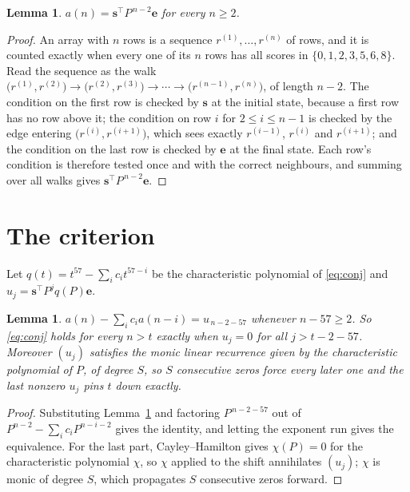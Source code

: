 \documentclass[11pt,a4paper]{article}
\theoremstyle{plain}
\newtheorem{lemma}[theorem]{Lemma}
\theoremstyle{definition}
\begin{document}
\begin{lemma}\label{lem:walk}
$a(n)=\mathbf{s}^{\!\top}P^{\,n-2}\mathbf{e}$ for every $n\ge2$.
\end{lemma}

\begin{proof}
An array with $n$ rows is a sequence $r^{(1)},\dots,r^{(n)}$ of rows, and it is counted
exactly when every one of its $n$ rows has all scores in $\{0,1,2,3,5,6,8\}$. Read the sequence as the
walk $\bigl(r^{(1)},r^{(2)}\bigr)\to\bigl(r^{(2)},r^{(3)}\bigr)\to\cdots\to
\bigl(r^{(n-1)},r^{(n)}\bigr)$, of length $n-2$. The condition on the first row is
checked by $\mathbf{s}$ at the initial state, because a first row has no row above it; the
condition on row $i$ for $2\le i\le n-1$ is checked by the edge entering
$\bigl(r^{(i)},r^{(i+1)}\bigr)$, which sees exactly $r^{(i-1)}$, $r^{(i)}$ and
$r^{(i+1)}$; and the condition on the last row is checked by $\mathbf{e}$ at the final
state. Each row's condition is therefore tested once and with the correct neighbours, and
summing over all walks gives $\mathbf{s}^{\!\top}P^{\,n-2}\mathbf{e}$.
\end{proof}

\section{The criterion}

Let $q(t)=t^{57}-\sum_i c_i t^{57-i}$ be the characteristic polynomial of
\eqref{eq:conj} and $u_j=\mathbf{s}^{\!\top}P^{j}q(P)\mathbf{e}$.

\begin{lemma}\label{lem:crit}
$a(n)-\sum_i c_i a(n-i)=u_{\,n-2-57}$ whenever $n-57\ge2$. So \eqref{eq:conj}
holds for every $n>t$ exactly when $u_j=0$ for all $j>t-2-57$. Moreover $(u_j)$
satisfies the monic linear recurrence given by the characteristic polynomial of $P$, of
degree $S$, so $S$ consecutive zeros force every later one and the last nonzero $u_j$ pins
$t$ down exactly.
\end{lemma}

\begin{proof}
Substituting Lemma~\ref{lem:walk} and factoring $P^{\,n-2-57}$ out of
$P^{n-2}-\sum_i c_i P^{n-i-2}$ gives the identity, and letting the exponent run gives the
equivalence. For the last part, Cayley--Hamilton gives $\chi(P)=0$ for the characteristic
polynomial $\chi$, so $\chi$ applied to the shift annihilates $(u_j)$; $\chi$ is monic of
degree $S$, which propagates $S$ consecutive zeros forward.
\end{proof}
\end{document}
